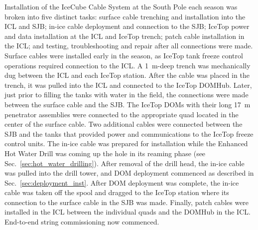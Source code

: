 Installation of the IceCube Cable System at the South Pole each season was
broken into five distinct tasks: surface cable trenching and
installation into the ICL and SJB; in-ice cable deployment and
connection to the SJB; IceTop power and data installation at the ICL and
IceTop trench; patch cable installation in the ICL; and testing,
troubleshooting and repair after all connections were made. Surface cables
were installed early in the season, as IceTop tank freeze control operations
required connection to the ICL. A 1~m-deep trench was mechanically
dug between the ICL and each IceTop station. After the cable was placed in
the trench, it was pulled into the ICL and connected to the IceTop
DOMHub. Later, just prior to filling the tanks with water in the field, the
connections were made between the surface cable and the SJB. The IceTop
DOMs with their long 17~m penetrator assemblies were connected to the
appropriate quad located in the center of the surface cable. Two additional
cables were connected between the SJB and the tanks that provided power and
communications to the IceTop freeze control units. The in-ice cable
was prepared for installation while the Enhanced Hot Water Drill was coming
up the hole in its reaming phase (see
Sec.~\ref{sec:hot_water_drilling}). After removal of the drill head, the 
in-ice cable was pulled into the drill tower, and DOM deployment
commenced as described in Sec.~\ref{sec:deployment_inst}. After DOM
deployment was complete, the in-ice cable was taken off the spool and
dragged to the IceTop station where its connection to the surface cable in the SJB was
made. Finally, patch cables were installed in the ICL between the
individual quads and the DOMHub in the ICL. End-to-end string commissioning
now commenced.

